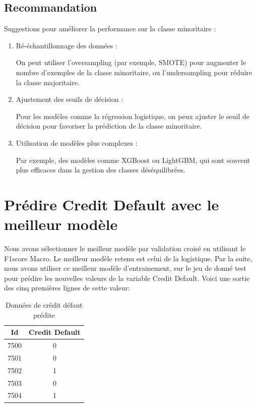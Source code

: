 \subsection{Recommandation}
\begin{flushleft}
Suggestions pour améliorer la performance sur la classe minoritaire :
\begin{enumerate}
\item Ré-échantillonnage des données :

On peut utiliser l'oversampling (par exemple, SMOTE) pour augmenter le nombre d'exemples de la classe minoritaire, ou l'undersampling pour réduire la classe majoritaire.

\item Ajustement des seuils de décision :

Pour les modèles comme la régression logistique, on peux ajuster le seuil de décision pour favoriser la prédiction de la classe minoritaire.

\item Utilisation de modèles plus complexes :

Par exemple, des modèles comme XGBoost ou LightGBM, qui sont souvent plus efficaces dans la gestion des classes déséquilibrées.
\end{enumerate}
\end{flushleft}

\section{ Prédire Credit Default avec le meilleur modèle}
\begin{flushleft}
Nous avons sélectionner le meilleur modèle par validation croisé en utilisant le F1\-score Macro.
Le meilleur modèle retenu est celui de la  logistique. Par la suite, nous avons utiliser ce meilleur modèle d'entrainement, sur le jeu de donné test pour prédire les nouvelles valeurs de la variable Credit Default. Voici une sortie des cinq premières lignes de cette valeur:
\end{flushleft}

\begin{table}[h]
\centering
\caption{Données de crédit défaut prédite}
\label{tab:credit_default}
\begin{tabular}{|c|c|}
\hline
\textbf{Id} & \textbf{Credit Default} \\ \hline
7500 & 0 \\ \hline
7501 & 0 \\ \hline
7502 & 1 \\ \hline
7503 & 0 \\ \hline
7504 & 1 \\ \hline
\end{tabular}
\end{table}

